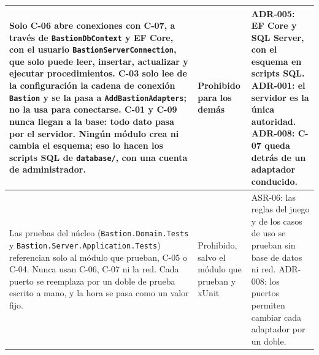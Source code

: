 \documentclass[11pt,letterpaper]{article}
\begin{document}
\begin{xltabular}{\linewidth}{|Y|>{\small\raggedright\arraybackslash}p{2.9cm}|>{\small\raggedright\arraybackslash}p{4.4cm}|}
  Solo C-06 abre conexiones con C-07, a través de \texttt{BastionDbContext} y EF Core, con el usuario \texttt{BastionServer\allowbreak Connection}, que solo puede leer, insertar, actualizar y ejecutar procedimientos. C-03 solo lee de la configuración la cadena de conexión \texttt{Bastion} y se la pasa a \texttt{AddBastion\allowbreak Adapters}; no la usa para conectarse. C-01 y C-09 nunca llegan a la base: todo dato pasa por el servidor. Ningún módulo crea ni cambia el esquema; eso lo hacen los scripts SQL de \texttt{database/}, con una cuenta de administrador. & Prohibido para los demás & ADR-005: EF Core y SQL Server, con el esquema en scripts SQL. ADR-001: el servidor es la única autoridad. ADR-008: C-07 queda detrás de un adaptador conducido.\\\hline
  Las pruebas del núcleo (\texttt{Bastion.\allowbreak Domain.\allowbreak Tests} y \texttt{Bastion.\allowbreak Server.\allowbreak Application.\allowbreak Tests}) referencian solo al módulo que prueban, C-05 o C-04. Nunca usan C-06, C-07 ni la red. Cada puerto se reemplaza por un doble de prueba escrito a mano, y la hora se pasa como un valor fijo. & Prohibido, salvo el módulo que prueban y xUnit & ASR-06: las reglas del juego y de los casos de uso se prueban sin base de datos ni red. ADR-008: los puertos permiten cambiar cada adaptador por un doble.\\\hline
\end{xltabular}

\newpage

\end{document}
